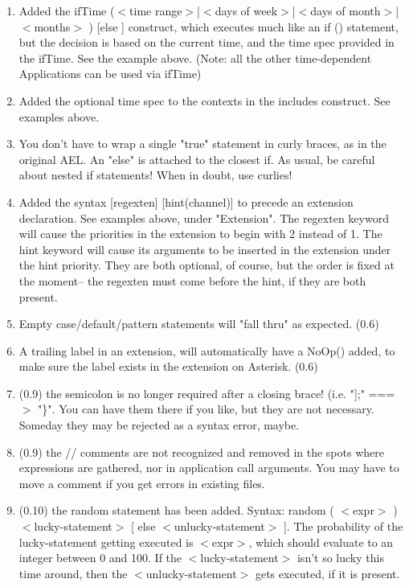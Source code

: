 {\begin{enumerate}
      extension/Macro.
  \item Added the ifTime ($<$time range$>$|$<$days of week$>$|$<$days of
      month$>$|$<$months$>$ ) {} [else {}] construct, which executes much
      like an if () statement, but the decision is based on the
      current time, and the time spec provided in the ifTime. See the
      example above. (Note: all the other time-dependent Applications
      can be used via ifTime)
  \item Added the optional time spec to the contexts in the includes
      construct. See examples above.
  \item You don't have to wrap a single "true" statement in curly
      braces, as in the original AEL. An "else" is attached to the
      closest if. As usual, be careful about nested if statements!
      When in doubt, use curlies!
  \item Added the syntax [regexten] [hint(channel)] to precede an
      extension declaration. See examples above, under
      "Extension". The regexten keyword will cause the priorities in
      the extension to begin with 2 instead of 1. The hint keyword
      will cause its arguments to be inserted in the extension under
      the hint priority. They are both optional, of course, but the
      order is fixed at the moment-- the regexten must come before the
      hint, if they are both present.
  \item Empty case/default/pattern statements will "fall thru" as
      expected. (0.6)
  \item A trailing label in an extension, will automatically have a
      NoOp() added, to make sure the label exists in the extension on
      Asterisk. (0.6)
  \item (0.9) the semicolon is no longer required after a closing brace!
      (i.e. "];" ===$>$ "\}". You can have them there if you like, but
      they are not necessary. Someday they may be rejected as a syntax
      error, maybe.
  \item (0.9) the // comments are not recognized and removed in the
      spots where expressions are gathered, nor in application call
      arguments. You may have to move a comment if you get errors in
      existing files.
  \item (0.10) the random statement has been added. Syntax: random (
      $<$expr$>$ ) $<$lucky-statement$>$ [ else $<$unlucky-statement$>$ ]. The
      probability of the lucky-statement getting executed is $<$expr$>$,
      which should evaluate to an integer between 0 and 100. If the
      $<$lucky-statement$>$ isn't so lucky this time around, then the
      $<$unlucky-statement$>$ gets executed, if it is present.
\end{enumerate}


}
